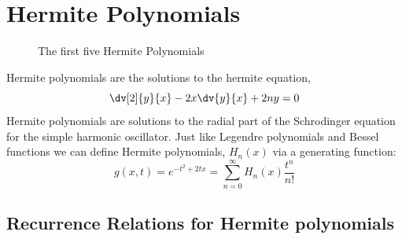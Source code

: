 \section{Hermite Polynomials}
\label{sec:hermite}

\begin{figure}
  \centering
  
  \caption{The first five Hermite Polynomials}
  \label{fig:hermite}
\end{figure}
Hermite polynomials are the solutions to the hermite equation,
\begin{equation}
  \label{eq:hermitede}
  \dv[2]{y}{x} - 2x \dv{y}{x} + 2n y = 0
\end{equation}
Hermite polynomials are solutions to the radial part of the
Schrodinger equation for the simple harmonic oscillator. Just like
Legendre polynomials and Bessel functions we can define Hermite
polynomials, $H_n (x)$ via a generating function:
\begin{equation}
  \label{eq:hermite}
  g(x,t) = e^{-t^2 + 2tx} = \sum^\infty_{n=0} H_n(x) \frac{t^n}{n!}
\end{equation}

\subsection{Recurrence Relations for Hermite polynomials}
\label{sec:hermiterecurs}

